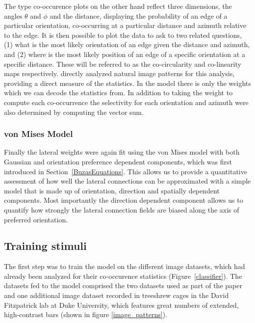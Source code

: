 The \cite{Geisler2001} type co-occurence plots on the other hand
reflect three dimensions, the angles $\theta$ and $\phi$ and the
distance, displaying the probability of an edge of a particular
orientation, co-occurring at a particular distance and azimuth
relative to the edge. It is then possible to plot the data to ask to
two related questions, (1) what is the most likely orientation of an
edge given the distance and azimuth, and (2) where is the most likely
position of an edge of a specific orientation at a specific
distance. These will be referred to as the co-circularity and
co-linearity maps respectively. \citep{Geisler2001} directly analyzed
natural image patterns for this analysis, providing a direct measure
of the statistics. In the model there is only the weights which we can
decode the statistics from. In addition to taking the weight to
compute each co-occurrence the selectivity for each orientation and
azimuth were also determined by computing the vector sum.

\subsubsection{von Mises Model}

Finally the lateral weights were again fit using the von Mises model
with both Gaussian and orientation preference dependent components,
which was first introduced in Section~\ref{BuzasEquations}. This
allows us to provide a quantitative assessment of how well the lateral
connections can be approximated with a simple model that is made up of
orientation, direction and spatially dependent components. Most
importantly the direction dependent component allows us to quantify
how strongly the lateral connection fields are biased along the axis
of preferred orientation.

\subsection{Training stimuli}

The first step was to train the model on the different image datasets,
which had already been analyzed for their co-occurence statistics
(Figure~\ref{classifier}). The datasets fed to the model comprised the
two datasets used as part of the paper and one additional image
dataset recorded in treeshrew cages in the David Fitzpatrick lab at
Duke University, which features great numbers of extended,
high-contrast bars (shown in figure \ref{image_patterns}).

